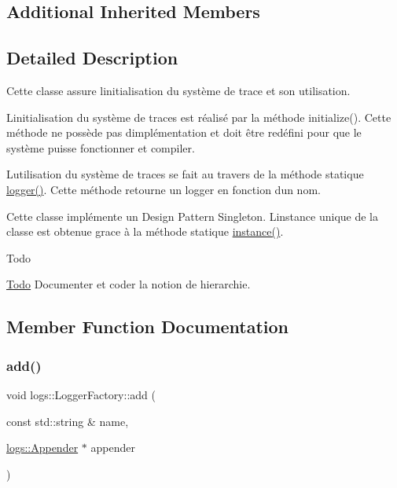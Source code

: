 \subsection*{Additional Inherited Members}


\subsection{Detailed Description}
Cette classe assure l\textquotesingle{}initialisation du système de trace et son utilisation. 

L\textquotesingle{}initialisation du système de traces est réalisé par la méthode initialize(). Cette méthode ne possède pas d\textquotesingle{}implémentation et doit être redéfini pour que le système puisse fonctionner et compiler.

L\textquotesingle{}utilisation du système de traces se fait au travers de la méthode statique \hyperlink{classlogs_1_1LoggerFactory_a82585b5de73e471e06cafdccc3b3721e}{logger()}. Cette méthode retourne un logger en fonction d\textquotesingle{}un nom.

Cette classe implémente un Design Pattern Singleton. L\textquotesingle{}instance unique de la classe est obtenue grace à la méthode statique \hyperlink{classlogs_1_1LoggerFactory_a90478b91d7af2ef8841ded21e3521f69}{instance()}.

\begin{DoxyRefDesc}{Todo}
\item[\hyperlink{todo__todo000004}{Todo}]Documenter et coder la notion de hierarchie. \end{DoxyRefDesc}


\subsection{Member Function Documentation}
\mbox{\label{classlogs_1_1LoggerFactory_ac89f19c0ffd71aa8cdc1c2d44c03809e}} 
\subsubsection{\texorpdfstring{add()}{add()}\hspace{0.1cm}{\footnotesize\ttfamily [1/3]}}
{\footnotesize\ttfamily void logs\+::\+Logger\+Factory\+::add (\begin{DoxyParamCaption}\item[{const std\+::string \&}]{name,  }\item[{\hyperlink{classlogs_1_1Appender}{logs\+::\+Appender} $\ast$}]{appender }\end{DoxyParamCaption})\hspace{0.3cm}{\ttfamily [protected]}}



